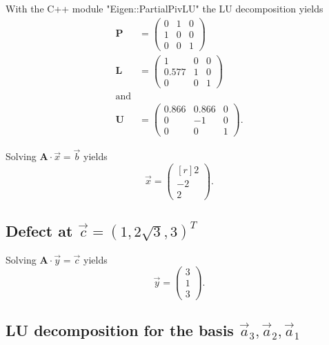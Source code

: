 With the C++ module "Eigen::PartialPivLU" the LU decomposition yields
\begin{align}
    \symbf{P} &= 
    \begin{pmatrix}
        0 & 1 & 0 \\
        1 & 0 & 0 \\
        0 & 0 & 1 
    \end{pmatrix} \\
    \symbf{L} &= 
    \begin{pmatrix}
        1 & 0 & 0 \\
        0.577 & 1 & 0 \\
        0 & 0 & 1 
    \end{pmatrix} \\ \text{and} \\
    \symbf{U} &= 
    \begin{pmatrix}
        0.866 & 0.866 & 0 \\
        0 & -1 & 0 \\
        0 & 0 & 1 
    \end{pmatrix} .
\end{align}

Solving $\symbf{A} \cdot \vec{x} = \vec{b}$ yields 
\begin{equation}
    \vec{x} = 
    \begin{pmatrix*}[r]
        2 \\ -2 \\ 2
    \end{pmatrix*} .
\end{equation}

\subsection{Defect at $\vec{c} = (1,2\sqrt{3},3)^T$}

Solving $\symbf{A} \cdot \vec{y} = \vec{c}$ yields
\begin{equation}
    \vec{y} = 
    \begin{pmatrix}
        3 \\ 1 \\ 3
    \end{pmatrix} .
\end{equation}

\subsection{LU decomposition for the basis ${\vec{a}_3,\vec{a}_2,\vec{a}_1}$}

